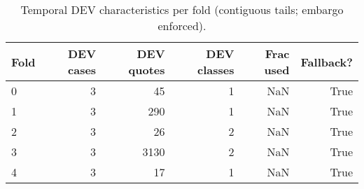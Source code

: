 \begin{table}
\caption{Temporal DEV characteristics per fold (contiguous tails; embargo enforced).}
\label{tab:temporal-integrity}
\begin{tabular}{lrrrrr}
\toprule
Fold & DEV cases & DEV quotes & DEV classes & Frac used & Fallback? \\
\midrule
0 & 3 & 45 & 1 & NaN & True \\
1 & 3 & 290 & 1 & NaN & True \\
2 & 3 & 26 & 2 & NaN & True \\
3 & 3 & 3130 & 2 & NaN & True \\
4 & 3 & 17 & 1 & NaN & True \\
\bottomrule
\end{tabular}
\end{table}
